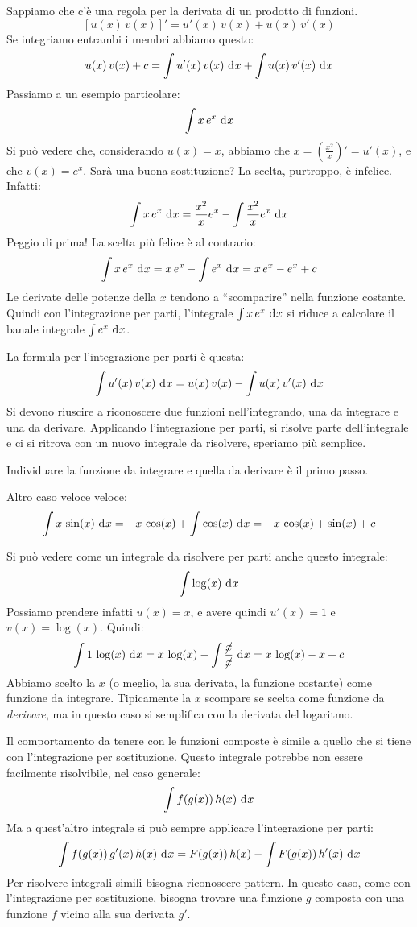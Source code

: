 Sappiamo che c'\`e una regola per la derivata di un prodotto di funzioni.
\[
\left[ u(x) \, v(x) \right]' = u'(x) \, v(x) + u(x) \, v'(x)
\]
Se integriamo entrambi i membri abbiamo questo:
\[
u(x) \, v(x) + c = 
\int u'(x) \, v(x) \dx + \int u(x) \, v'(x) \dx
\]
Passiamo a un esempio particolare:
\[
\int x \, e^x \dx
\]
Si pu\`o vedere che, considerando $u(x) = x$, abbiamo che $x = \left( \frac{x^2}{x} \right)' = u'(x)$, e che $v(x) = e^x$. Sar\`a una buona sostituzione? La scelta, purtroppo, \`e infelice. Infatti:
\[
\int x \, e^x \dx = \frac{x^2}{x} e^x - \int \frac{x^2}{x} e^x \dx
\]
Peggio di prima! La scelta pi\`u felice \`e al contrario:
\[
\int x \, e^x \dx = x \, e^x - \int e^x \dx = x \, e^x - e^x + c
\]
Le derivate delle potenze della $x$ tendono a ``scomparire'' nella funzione costante. Quindi con l'integrazione per parti, l'integrale $\int x \, e^x \dx$ si riduce a calcolare il banale integrale $\int e^x \dx$.

\begin{defn}
La formula per l'integrazione per parti \`e questa:
\[
\int u' (x) \, v(x) \dx = u(x) \, v(x) - \int u (x) \, v' (x) \dx
\]
Si devono riuscire a riconoscere due funzioni nell'integrando, una da integrare e una da derivare. Applicando l'integrazione per parti, si risolve parte dell'integrale e ci si ritrova con un nuovo integrale da risolvere, speriamo pi\`u semplice.
\end{defn}

Individuare la funzione da integrare e quella da derivare \`e il primo passo.

Altro caso veloce veloce:
\[
\int x \, \sin(x) \dx = - x \, \cos (x) + \int \cos (x) \dx =
- x \, \cos(x) + \sin (x) + c
\]

Si pu\`o vedere come un integrale da risolvere per parti anche questo integrale:
\[
\int \log(x) \dx
\]
Possiamo prendere infatti $u(x) = x$, e avere quindi $u'(x) = 1$ e $v(x) = \log (x)$. Quindi:
\[
\int 1 \, \log(x) \dx = x \, \log (x) - \int \frac{\cancel{x}}{\cancel{x}} \dx = 
x \, \log (x) - x + c
\]
Abbiamo scelto la $x$ (o meglio, la sua derivata, la funzione costante) come funzione da integrare. Tipicamente la $x$ scompare se scelta come funzione da \emph{derivare}, ma in questo caso si semplifica con la derivata del logaritmo.

Il comportamento da tenere con le funzioni composte \`e simile a quello che si tiene con l'integrazione per sostituzione. Questo integrale potrebbe non essere facilmente risolvibile, nel caso generale:
\[
\int f(g(x)) \, h(x) \dx
\]
Ma a quest'altro integrale si pu\`o sempre applicare l'integrazione per parti:
\[
\int f(g(x)) \, g'(x) \, h(x) \dx =
F(g(x)) \, h(x) - \int F(g(x)) \, h'(x) \dx
\]
Per risolvere integrali simili bisogna riconoscere pattern. In questo caso, come con l'integrazione per sostituzione, bisogna trovare una funzione $g$ composta con una funzione $f$ vicino alla sua derivata $g'$.

